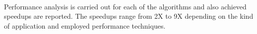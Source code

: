 \paragraph*{}Performance analysis is carried out for each of the algorithms and also achieved speedups are reported. The speedups range from 2X to 9X depending on the kind of application and employed performance techniques.
	